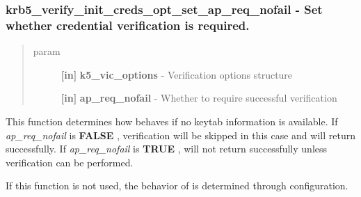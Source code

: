 \documentclass[letterpaper,10pt,english]{sphinxmanual}
\begin{document}
\subsubsection{krb5\_verify\_init\_creds\_opt\_set\_ap\_req\_nofail -  Set whether credential verification is required.}
\label{appdev/refs/api/krb5_verify_init_creds_opt_set_ap_req_nofail::doc}\label{appdev/refs/api/krb5_verify_init_creds_opt_set_ap_req_nofail:krb5-verify-init-creds-opt-set-ap-req-nofail-set-whether-credential-verification-is-required}

\begin{fulllineitems}
\label{appdev/refs/api/krb5_verify_init_creds_opt_set_ap_req_nofail:krb5_verify_init_creds_opt_set_ap_req_nofail}
\end{fulllineitems}

\begin{quote}\begin{description}
\item[{param}] \leavevmode
\textbf{{[}in{]}} \textbf{k5\_vic\_options} - Verification options structure

\textbf{{[}in{]}} \textbf{ap\_req\_nofail} - Whether to require successful verification

\end{description}\end{quote}

This function determines how {\hyperref[appdev/refs/api/krb5_verify_init_creds:krb5_verify_init_creds]{}} behaves if no keytab information is available. If \emph{ap\_req\_nofail} is \textbf{FALSE} , verification will be skipped in this case and {\hyperref[appdev/refs/api/krb5_verify_init_creds:krb5_verify_init_creds]{}} will return successfully. If \emph{ap\_req\_nofail} is \textbf{TRUE} , {\hyperref[appdev/refs/api/krb5_verify_init_creds:krb5_verify_init_creds]{}} will not return successfully unless verification can be performed.

If this function is not used, the behavior of {\hyperref[appdev/refs/api/krb5_verify_init_creds:krb5_verify_init_creds]{}} is determined through configuration.
\end{document}
